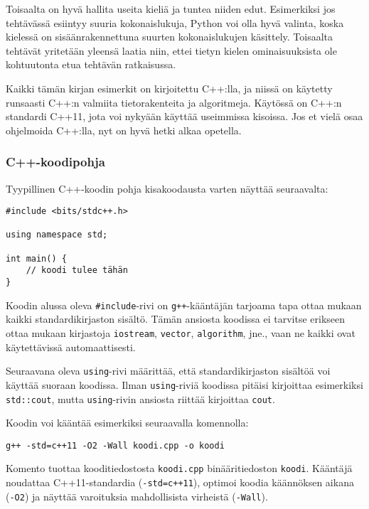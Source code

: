 Toisaalta on hyvä hallita useita kieliä
ja tuntea niiden edut.
Esimerkiksi jos tehtävässä esiintyy
suuria kokonaislukuja,
Python voi olla hyvä valinta,
koska kielessä on sisäänrakennettuna
suurten kokonaislukujen käsittely.
Toisaalta tehtävät yritetään yleensä laatia niin,
ettei tietyn kielen ominaisuuksista
ole kohtuutonta etua tehtävän ratkaisussa.

Kaikki tämän kirjan esimerkit on kirjoitettu C++:lla,
ja niissä on käytetty runsaasti C++:n valmiita 
tietorakenteita ja algoritmeja.
Käytössä on C++:n standardi C++11,
jota voi nykyään käyttää useimmissa kisoissa.
Jos et vielä osaa ohjelmoida C++:lla,
nyt on hyvä hetki alkaa opetella.

\subsubsection{C++-koodipohja}

Tyypillinen C++-koodin pohja kisakoodausta varten
näyttää seuraavalta:

\begin{lstlisting}
#include <bits/stdc++.h>

using namespace std;

int main() {
    // koodi tulee tähän
}
\end{lstlisting}

Koodin alussa oleva \texttt{\#include}-rivi
on \texttt{g++}-kääntäjän tarjoama tapa
ottaa mukaan kaikki standardikirjaston sisältö.
Tämän ansiosta koodissa ei tarvitse erikseen
ottaa mukaan kirjastoja \texttt{iostream},
\texttt{vector}, \texttt{algorithm}, jne.,
vaan ne kaikki ovat käytettävissä automaattisesti.

Seuraavana oleva \texttt{using}-rivi määrittää,
että standardikirjaston sisältöä voi käyttää
suoraan koodissa.
Ilman \texttt{using}-riviä koodissa pitäisi
kirjoittaa esimerkiksi \texttt{std::cout},
mutta \texttt{using}-rivin ansiosta riittää
kirjoittaa \texttt{cout}.

Koodin voi kääntää esimerkiksi
seuraavalla komennolla:

\begin{lstlisting}
g++ -std=c++11 -O2 -Wall koodi.cpp -o koodi
\end{lstlisting}

Komento tuottaa kooditiedostosta \texttt{koodi.cpp}
binääritiedoston \texttt{koodi}.
Kääntäjä noudattaa C++11-standardia
(\texttt{-std=c++11}),
optimoi koodia käännöksen aikana (\texttt{-O2})
ja näyttää varoituksia
mahdollisista virheistä (\texttt{-Wall}).

